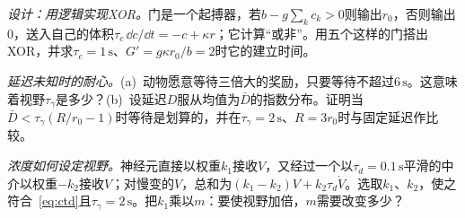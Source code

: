 \begin{exercise}[\lvlB]
\label{ex:05:6}
\emph{设计：用逻辑实现XOR。}门是一个起搏器，若$b-g\sum_kc_k>0$则输出$r_0$，否则输出$0$，送入自己的体积$\tau_c\,\dd c/\dd t=-c+\kappa r$；它计算“或非”。用五个这样的门搭出XOR，并求$\tau_c=1\,\text{s}$、$G'=g\kappa r_0/b=2$时它的建立时间。
\end{exercise}

\begin{exercise}[\lvlB]
\label{ex:05:7}
\emph{延迟未知时的耐心。}(a)~动物愿意等待三倍大的奖励，只要等待不超过$6\,\text{s}$。这意味着视野$\tau_\gamma$是多少？(b)~设延迟$D$服从均值为$\bar D$的指数分布。证明当$\bar D<\tau_\gamma(R/r_0-1)$时等待是划算的，并在$\tau_\gamma=2\,\text{s}$、$R=3r_0$时与固定延迟作比较。
\end{exercise}

\begin{exercise}[\lvlC]
\label{ex:05:8}
\emph{浓度如何设定视野。}神经元直接以权重$k_1$接收$V$，又经过一个以$\tau_d=0.1\,\text{s}$平滑的中介以权重$-k_2$接收$V$；对慢变的$V$，总和为$(k_1-k_2)V+k_2\tau_d\dot V$。选取$k_1$、$k_2$，使之符合~\eqref{eq:ctd}且$\tau_\gamma=2\,\text{s}$。把$k_1$乘以$m$：要使视野加倍，$m$需要改变多少？
\end{exercise}
